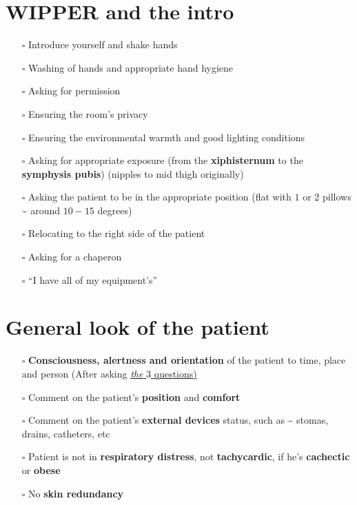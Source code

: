 \documentclass[
  13.5pt,
  a4paper,
  DIV=11,
  numbers=noendperiod]{scrreprt}
\providecommand{\tightlist}{%
  \setlength{\itemsep}{0pt}\setlength{\parskip}{0pt}}
\begin{document}
\section{WIPPER and the intro}\label{wipper-and-the-intro-2}

\begin{itemize}
\tightlist
\item[$\square$]
  Introduce yourself and shake hands
\item[$\square$]
  Washing of hands and appropriate hand hygiene
\item[$\square$]
  Asking for permission
\item[$\square$]
  Ensuring the room's privacy
\item[$\square$]
  Ensuring the environmental warmth and good lighting conditions
\item[$\square$]
  Asking for appropriate exposure (from the \textbf{xiphisternum} to the
  \textbf{symphysis pubis}) (nipples to mid thigh originally)
\item[$\square$]
  Asking the patient to be in the appropriate position (flat with \(1\)
  or \(2\) pillows \textasciitilde{} around \(10-15\) degrees)
\item[$\square$]
  Relocating to the right side of the patient
\item[$\square$]
  Asking for a chaperon
\item[$\square$]
  ``I have all of my equipment's''
\end{itemize}

\section{General look of the
patient}\label{general-look-of-the-patient-2}

\begin{itemize}
\tightlist
\item[$\square$]
  \textbf{Consciousness, alertness and orientation} of the patient to
  time, place and person (After asking
  \href{miscellaneous.qmd}{\emph{the} \(3\) questions)}
\item[$\square$]
  Comment on the patient's \textbf{position} and \textbf{comfort}
\item[$\square$]
  Comment on the patient's \textbf{external devices} status, such as
  \textasciitilde{} stomas, drains, catheters, etc
\item[$\square$]
  Patient is not in \textbf{respiratory distress}, not
  \textbf{tachycardic}, if he's \textbf{cachectic} or \textbf{obese}
\item[$\square$]
  No \textbf{skin redundancy}
\end{itemize}
\end{document}
